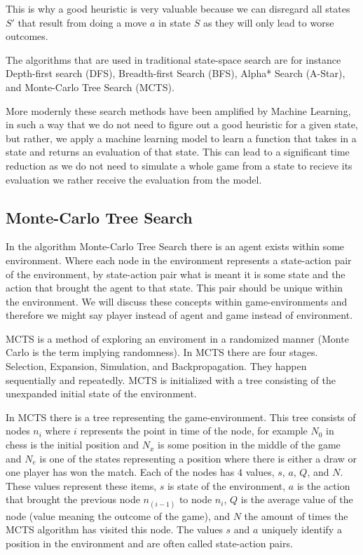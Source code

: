 This is why a good heuristic is very valuable because we can disregard all states $S'$ that 
result from doing a move $a$ in state $S$ as they will only lead to worse outcomes.

The algorithms that are used in traditional state-space search are for instance Depth-first search (DFS),
Breadth-first Search (BFS), Alpha* Search (A-Star), and Monte-Carlo Tree Search (MCTS).

More modernly these search methods have been amplified by Machine Learning, in such a way that 
we do not need to figure out a good heuristic for a given state, but rather, we apply a machine 
learning model to learn a function that takes in a state and returns an evaluation of that state.
This can lead to a significant time reduction as we do not need to simulate a whole game from a 
state to recieve its evaluation we rather receive the evaluation from the model.

\subsection{Monte-Carlo Tree Search}

\label{sec:mcts}

In the algorithm Monte-Carlo Tree Search there is an agent exists
within some environment. Where each node in the environment represents a state-action pair of the environment, by
state-action pair what is meant it is some state and the action that brought the agent to
that state. This pair should be unique within the environment. We will discuss these concepts within game-environments
and therefore we might say player instead of agent and game instead of environment.

MCTS is a method of exploring an enviroment in a randomized manner (Monte Carlo is the term implying
randomness). In MCTS there are four stages. Selection, Expansion, Simulation, and Backpropagation. They happen sequentially
and repeatedly. MCTS is initialized with a tree consisting of the unexpanded initial state of the environment.

In MCTS there is a tree representing the game-environment. This tree consists of nodes $n_i$ where $i$ represents the point in time
of the node, for example $N_0$ in chess is the initial position and $N_x$ is some position in the middle of the game and $N_e$ is one of
the states representing a position where there is either a draw or one player has won the match. Each of the nodes has $4$ values,
$s$, $a$, $Q$, and $N$. These values represent these items, $s$ is state of the environment, $a$ is the action that brought
the previous node $n_(i-1)$ to node $n_i$, $Q$ is the average value of the node (value meaning the outcome of the game),
and $N$ the amount of times the MCTS algorithm has visited this node. The values $s$ and $a$ uniquely identify a position
in the environment and are often called state-action pairs.

